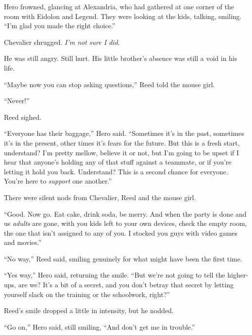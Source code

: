 Hero frowned, glancing at Alexandria, who had gathered at one corner of the room with Eidolon and Legend.  They were looking at the kids, talking, smiling.  ``I'm glad you made the right choice.''



Chevalier shrugged.  \emph{I'm not sure I did}.



He was still angry.  Still hurt.  His little brother's absence was still a void in his life.



``Maybe now you can stop asking questions,'' Reed told the mouse girl.



``Never!''



Reed sighed.



``Everyone has their baggage,'' Hero said.  ``Sometimes it's in the past, sometimes it's in the present, other times it's fears for the future.  But this is a fresh start, understand?  I'm pretty mellow, believe it or not, but I'm going to be upset if I hear that anyone's holding any of that stuff against a teammate, or if you're letting it hold you back.  Understand?  This is a second chance for everyone.  You're here to \emph{support} one another.''



There were silent nods from Chevalier, Reed and the mouse girl.



``Good.  Now go.  Eat cake, drink soda, be merry.  And when the party is done and us \emph{adults} are gone, with you kids left to your own devices, check the empty room, the one that isn't assigned to any of you.  I stocked you guys with video games and movies.''



``No way,'' Reed said, smiling genuinely for what might have been the first time.



``Yes way,'' Hero said, returning the smile.  ``But we're not going to tell the higher-ups, are we?  It's a bit of a secret, and you don't betray that secret by letting yourself slack on the training or the schoolwork, right?''



Reed's smile dropped a little in intensity, but he nodded.



``Go on,'' Hero said, still smiling,  ``And don't get me in trouble.''



